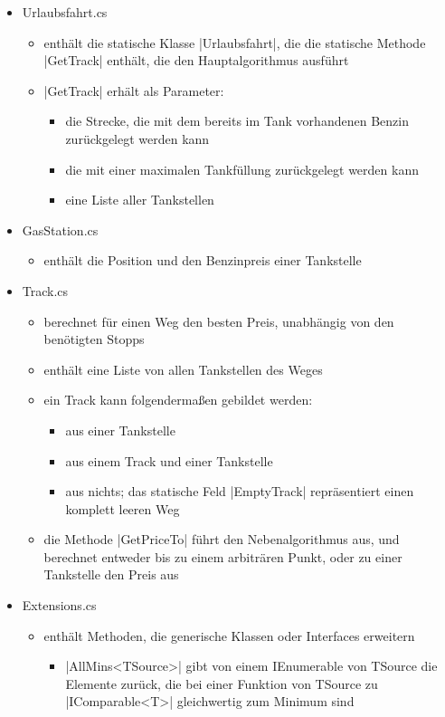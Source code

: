 \documentclass[a4paper,10pt,ngerman]{scrartcl}
\begin{document}
\begin{itemize}
	\item Urlaubsfahrt.cs
	\begin{itemize}
		\item enthält die statische Klasse |Urlaubsfahrt|, die die statische Methode |GetTrack| enthält, die den Hauptalgorithmus ausführt
		\item |GetTrack| erhält als Parameter:
		 \begin{itemize}
		 	\item die Strecke, die mit dem bereits im Tank vorhandenen Benzin zurückgelegt werden kann
		 	\item die mit einer maximalen Tankfüllung zurückgelegt werden kann
		 	\item eine Liste aller Tankstellen
		\end{itemize}
    \end{itemize}
    
    \item GasStation.cs
    \begin{itemize}
        \item enthält die Position und den Benzinpreis einer Tankstelle
    \end{itemize}

    \item Track.cs
	\begin{itemize}
		\item berechnet für einen Weg den besten Preis, unabhängig von den benötigten Stopps
		\item enthält eine Liste von allen Tankstellen des Weges
		\item ein Track kann folgendermaßen gebildet werden:
		\begin{itemize}
			\item aus einer Tankstelle
			\item aus einem Track und einer Tankstelle
			\item aus nichts; das statische Feld |EmptyTrack| repräsentiert einen komplett leeren Weg
		\end{itemize}
        \item die Methode |GetPriceTo| führt den Nebenalgorithmus aus, und berechnet entweder bis zu einem arbiträren Punkt, oder zu einer Tankstelle den Preis aus
    \end{itemize}

    \item Extensions.cs
    \begin{itemize}
        \item enthält Methoden, die generische Klassen oder Interfaces erweitern
        \begin{itemize}
            \item |AllMins<TSource>| gibt von einem IEnumerable von TSource die Elemente zurück, die bei einer Funktion von TSource zu |IComparable<T>| gleichwertig zum Minimum sind
        \end{itemize}
    \end{itemize}
\end{itemize}
\end{document}
